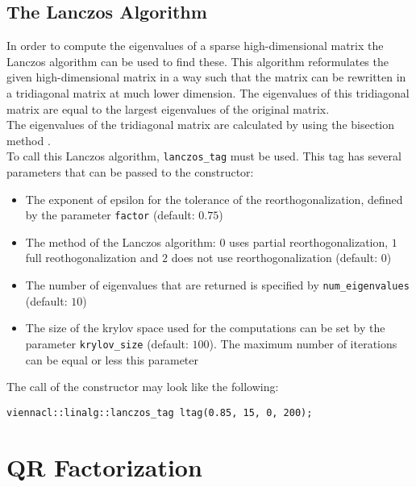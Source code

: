 
\subsection{The Lanczos Algorithm}
In order to compute the eigenvalues of a sparse high-dimensional matrix the Lanczos algorithm can be used to find these. 
This algorithm reformulates the given high-dimensional matrix in a way such that the matrix can be rewritten in a tridiagonal matrix at much lower dimension.
The eigenvalues of this tridiagonal matrix are equal to the largest eigenvalues of the original matrix. \\
The eigenvalues of the tridiagonal matrix are calculated by using the bisection method \cite{golub:matrix-computations}. \\
To call this Lanczos algorithm, \lstinline|lanczos_tag| must be used.
This tag has several parameters that can be passed to the constructor:

\begin{itemize}
 \item The exponent of epsilon for the tolerance of the reorthogonalization, defined by the parameter \lstinline|factor| (default: $0.75$)
 \item The method of the Lanczos algorithm: $0$ uses partial reorthogonalization, $1$ full reothogonalization and $2$ does not use reorthogonalization (default: $0$)
 \item The number of eigenvalues that are returned is specified by \lstinline|num_eigenvalues| (default: $10$)
 \item The size of the krylov space used for the computations can be set by the parameter \lstinline|krylov_size| (default: $100$). The maximum number of iterations can be equal or less this parameter
\end{itemize}
The call of the constructor may look like the following:
\begin{lstlisting}
viennacl::linalg::lanczos_tag ltag(0.85, 15, 0, 200);
\end{lstlisting}



\section{QR Factorization}


